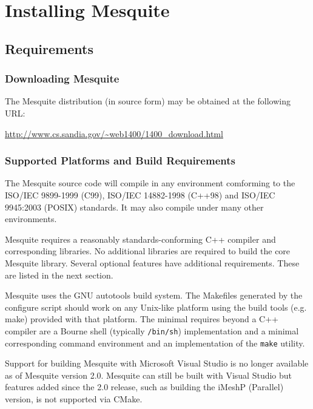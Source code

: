 \chapter{Installing Mesquite} \label{sec:install}

\section{Requirements}

\subsection{Downloading Mesquite}
The Mesquite distribution (in source form) may be obtained at the following URL:
\begin{center}
\url{http://www.cs.sandia.gov/~web1400/1400_download.html}
\end{center}

\subsection{Supported Platforms and Build Requirements}
The Mesquite source code will compile in any environment comforming to the ISO/IEC 9899-1999 (C99), ISO/IEC 14882-1998 (C++98) and ISO/IEC 9945:2003 (POSIX) standards. It may also compile under many other environments.

Mesquite requires a reasonably standards-conforming C++ compiler and corresponding libraries.  No additional libraries are required to build the core Mesquite library. Several optional features have additional requirements.  These are listed in the next section.

Mesquite uses the GNU autotools build system.  The Makefiles generated by the
configure script should work on any Unix-like platform using the build tools
(e.g. make) provided with that platform.  The minimal requires beyond a C++
compiler are a Bourne shell (typically \texttt{/bin/sh}) implementation and
a minimal corresponding command environment and an implementation of the \texttt{make} utility.

Support for building Mesquite with Microsoft Visual Studio is no longer available as of Mesquite version 2.0.  Mesquite can still be built with Visual Studio but features added since the 2.0 release, such as building the iMeshP (Parallel) version, is not supported via CMake.


